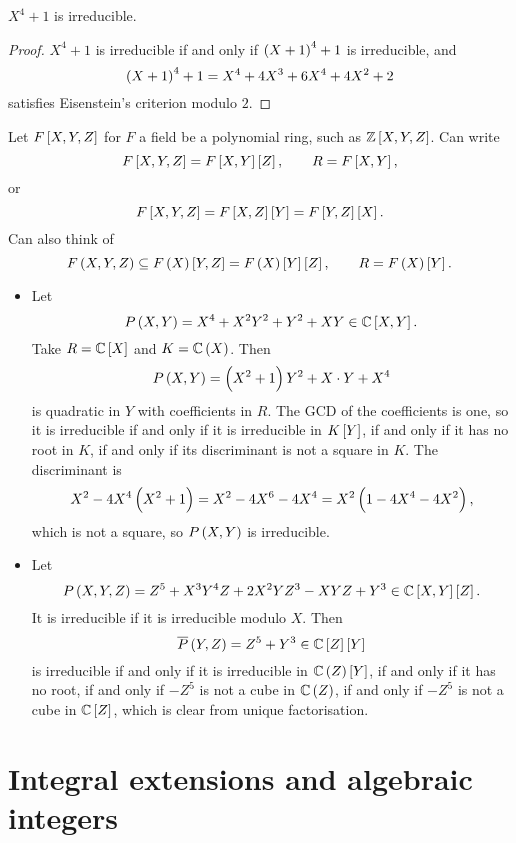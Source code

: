 \begin{corollary}
$ X^4 + 1 $ is irreducible.
\end{corollary}

\begin{proof}
$ X^4 + 1 $ is irreducible if and only if $ \br{X + 1}^4 + 1 $ is irreducible, and
$$ \br{X + 1}^4 + 1 = X^4 + 4X^3 + 6X^4 + 4X^2 + 2 $$
satisfies Eisenstein's criterion modulo $ 2 $.
\end{proof}


\begin{example*}
Let $ F\sbr{X, Y, Z} $ for $ F $ a field be a polynomial ring, such as $ \ZZ\sbr{X, Y, Z} $. Can write
$$ F\sbr{X, Y, Z} = F\sbr{X, Y}\sbr{Z}, \qquad R = F\sbr{X, Y}, $$
or
$$ F\sbr{X, Y, Z} = F\sbr{X, Z}\sbr{Y} = F\sbr{Y, Z}\sbr{X}. $$
Can also think of
$$ F\br{X, Y, Z} \subseteq F\br{X}\sbr{Y, Z} = F\br{X}\sbr{Y}\sbr{Z}, \qquad R = F\br{X}\sbr{Y}. $$
\begin{itemize}
\item Let
$$ P\br{X, Y} = X^4 + X^2Y^2 + Y^2 + XY \in \CC\sbr{X, Y}. $$
Take $ R = \CC\sbr{X} $ and $ K = \CC\br{X} $. Then
$$ P\br{X, Y} = \br{X^2 + 1}Y^2 + X \cdot Y + X^4 $$
is quadratic in $ Y $ with coefficients in $ R $. The GCD of the coefficients is one, so it is irreducible if and only if it is irreducible in $ K\sbr{Y} $, if and only if it has no root in $ K $, if and only if its discriminant is not a square in $ K $. The discriminant is
$$ X^2 - 4X^4\br{X^2 + 1} = X^2 - 4X^6 - 4X^4 = X^2\br{1 - 4X^4 - 4X^2}, $$
which is not a square, so $ P\br{X, Y} $ is irreducible.
\item Let
$$ P\br{X, Y, Z} = Z^5 + X^3Y^4Z + 2X^2YZ^3 - XYZ + Y^3 \in \CC\sbr{X, Y}\sbr{Z}. $$
It is irreducible if it is irreducible modulo $ X $. Then
$$ \overline{P}\br{Y, Z} = Z^5 + Y^3 \in \CC\sbr{Z}\sbr{Y} $$
is irreducible if and only if it is irreducible in $ \CC\br{Z}\sbr{Y} $, if and only if it has no root, if and only if $ -Z^5 $ is not a cube in $ \CC\br{Z} $, if and only if $ -Z^5 $ is not a cube in $ \CC\sbr{Z} $, which is clear from unique factorisation.
\end{itemize}
\end{example*}

\pagebreak

\section{Integral extensions and algebraic integers}

